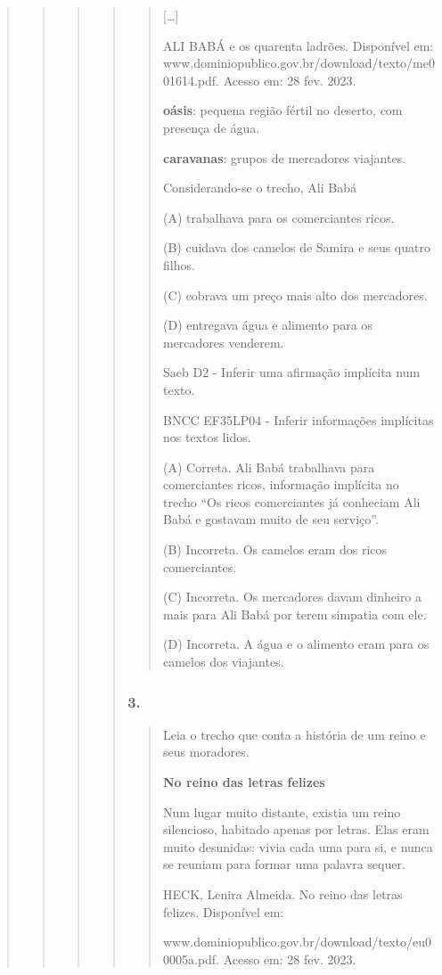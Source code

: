\begin{quote}
\begin{quote}
\begin{quote}
\begin{quote}
\begin{quote}
{[}\ldots{}{]}

ALI BABÁ e os quarenta ladrões. Disponível em:
www.dominiopublico.gov.br/download/texto/me001614.pdf. Acesso em: 28
fev. 2023.

\textbf{oásis}: pequena região fértil no deserto, com presença de água.

\textbf{caravanas}: grupos de mercadores viajantes.

Considerando-se o trecho, Ali Babá

\protect\hypertarget{_Hlk128465624}{}{}(A) trabalhava para os
comerciantes ricos.

(B) cuidava dos camelos de Samira e seus quatro filhos.

(C) cobrava um preço mais alto dos mercadores.

(D) entregava água e alimento para os mercadores venderem.

Saeb D2 - Inferir uma afirmação implícita num texto.

BNCC EF35LP04 - Inferir informações implícitas nos textos lidos.

(A) Correta. Ali Babá trabalhava para comerciantes ricos, informação
implícita no trecho ``Os ricos comerciantes já conheciam Ali Babá e
gostavam muito de seu serviço''.

(B) Incorreta. Os camelos eram dos ricos comerciantes.

(C) Incorreta. Os mercadores davam dinheiro a mais para Ali Babá por
terem simpatia com ele.

(D) Incorreta. A água e o alimento eram para os camelos dos viajantes.
\end{quote}

\subsubsection{3. }\label{section-90}

\begin{quote}
Leia o trecho que conta a história de um reino e seus moradores.

\textbf{No reino das letras felizes}

Num lugar muito distante, existia um reino silencioso, habitado apenas
por letras. Elas eram muito desunidas: vivia cada uma para si, e nunca
se reuniam para formar uma palavra sequer.

HECK, Lenira Almeida. No reino das letras felizes. Disponível em:

www.dominiopublico.gov.br/download/texto/eu00005a.pdf. Acesso em: 28
fev. 2023.


\end{quote}
\end{quote}
\end{quote}
\end{quote}
\end{quote}
